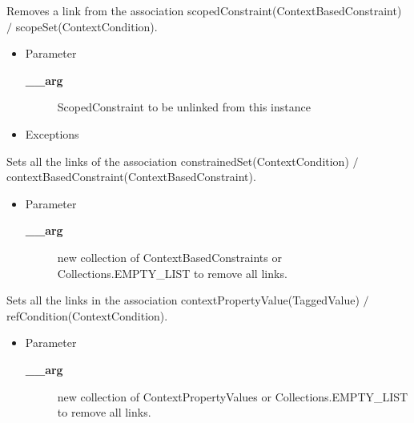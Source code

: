 \begin{desc}Removes a link from the association scopedConstraint(ContextBasedConstraint)
 $/$ scopeSet(ContextCondition).
\begin{itemize}
\item{Parameter
  \begin{description}
   \item[{\bf \_\_arg}]{ScopedConstraint to be unlinked from this instance}
  \end{description}}
\end{itemize}
\begin{itemize}
\item{{Exceptions}
}
\end{itemize}
\end{desc}

\begin{desc}Sets all the links of the association constrainedSet(ContextCondition)
 $/$ contextBasedConstraint(ContextBasedConstraint).
\begin{itemize}
\item{Parameter
  \begin{description}
   \item[{\bf \_\_arg}]{new collection of ContextBasedConstraints or Collections.EMPTY\_LIST to
        remove all links.}
  \end{description}}
\end{itemize}
\end{desc}

\begin{desc}Sets all the links in the association contextPropertyValue(TaggedValue)
 $/$ refCondition(ContextCondition).
\begin{itemize}
\item{Parameter
  \begin{description}
   \item[{\bf \_\_arg}]{new collection of ContextPropertyValues or Collections.EMPTY\_LIST to
        remove all links.}
  \end{description}}
\end{itemize}
\end{desc}

